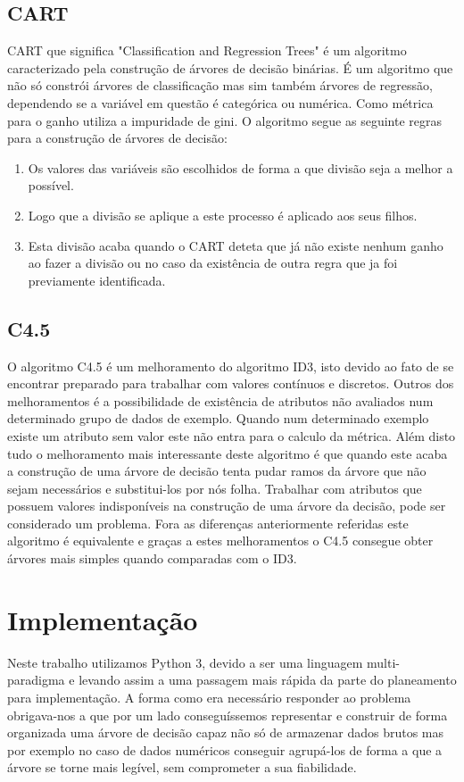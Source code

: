 \documentclass[12pt,a4paper]{article}
\begin{document}
\subsection{CART}
CART que significa "Classification and Regression Trees" é um algoritmo caracterizado pela construção de árvores de decisão binárias.\cite{rokach2005top} É um algoritmo que não só constrói árvores de classificação mas sim também árvores de regressão, dependendo se a variável em questão é categórica ou numérica. Como métrica para o ganho utiliza a impuridade de gini.
O algoritmo segue as seguinte regras para a construção de árvores de decisão:
\begin{enumerate}
	\item Os valores das variáveis são escolhidos de forma a que divisão seja a melhor a possível.
	\item Logo que a divisão se aplique a este processo é aplicado aos seus filhos.
	\item Esta divisão acaba quando o CART deteta que já não existe nenhum ganho ao fazer a divisão ou no caso da existência de outra regra que ja foi previamente identificada.  
\end{enumerate}

\subsection{C4.5}
O algoritmo C4.5 é um melhoramento do algoritmo ID3, isto devido ao fato de se encontrar preparado para trabalhar com valores contínuos e discretos. 
Outros dos melhoramentos é a possibilidade de existência de atributos não avaliados num determinado grupo de dados de exemplo. Quando num determinado exemplo existe um atributo sem valor este não entra para o calculo da métrica.
Além disto tudo o melhoramento mais interessante deste algoritmo é que quando este acaba a construção de uma árvore de decisão tenta pudar ramos da árvore que não sejam necessários e substitui-los por nós folha.
Trabalhar com atributos que possuem valores indisponíveis na construção de uma árvore da decisão, pode ser considerado um problema. 
Fora as diferenças anteriormente referidas este algoritmo é equivalente e graças a estes melhoramentos o C4.5 consegue obter árvores mais simples quando comparadas com o ID3. 

\section{Implementação}
Neste trabalho utilizamos Python 3, devido a ser uma linguagem multi-paradigma e levando assim a uma passagem mais rápida da parte do planeamento para implementação.
A forma como era necessário responder ao problema obrigava-nos a que por um lado conseguíssemos representar e construir de forma organizada uma árvore de decisão capaz não só de armazenar dados brutos mas por exemplo no caso de dados numéricos conseguir agrupá-los de forma a que a árvore se torne mais legível, sem comprometer a sua fiabilidade.  
\end{document}

